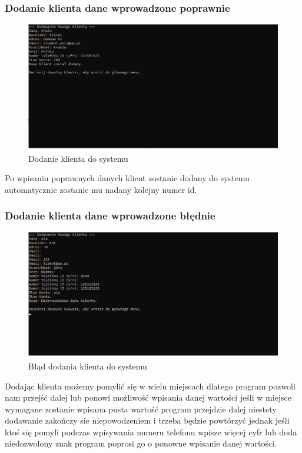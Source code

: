 \subsubsection{Dodanie klienta dane wprowadzone poprawnie}
\begin{figure}[h]
    \centering
    \includegraphics[width=\textwidth]{DodawanieKlientaPop.png}
      \caption{Dodanie klienta do systemu}
    \label{fig:example}
\end{figure}

Po wpisaniu poprawnych danych klient zostanie dodany do systemu automatycznie zostanie mu nadany kolejny numer id.
\newpage
\subsubsection{Dodanie klienta dane wprowadzone błędnie}
\begin{figure}[h]
    \centering
    \includegraphics[width=\textwidth]{DodawanieKlientaBle.png}
      \caption{Błąd dodania klienta do systemu}
    \label{fig:example}
\end{figure}

Dodając klienta możemy pomylić się w wielu miejscach dlatego program pozwoli nam przejść dalej lub ponowi możliwość wpisania danej wartości jeśli w miejsce wymagane zostanie wpisana pusta wartość program przejdzie dalej niestety dodawanie zakończy sie niepowodzeniem i trzeba będzie powtórzyć jednak jeśli ktoś się pomyli podczas wpisywania numeru telefonu wpisze więcej cyfr lub doda niedozwolony znak program poprosi go o ponowne wpisanie danej wartości. 


